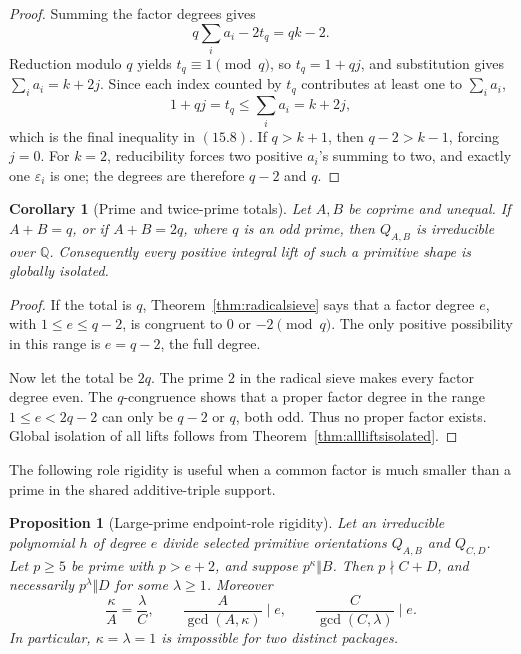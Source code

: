 \documentclass[11pt]{article}
\newtheorem{proposition}[theorem]{Proposition}
\newtheorem{corollary}[theorem]{Corollary}
\theoremstyle{definition}
\newcommand{\Q}{\mathbb Q}
\begin{document}
\begin{proof}
Summing the factor degrees gives
\[
 q\sum_i a_i-2t_q=qk-2.
\]
Reduction modulo \(q\) yields \(t_q\equiv1\pmod q\), so
\(t_q=1+qj\), and substitution gives \(\sum_i a_i=k+2j\).  Since each
index counted by \(t_q\) contributes at least one to \(\sum_i a_i\),
\[
 1+qj=t_q\leq\sum_i a_i=k+2j,
\]
which is the final inequality in \((15.8)\).  If \(q>k+1\), then
\(q-2>k-1\), forcing \(j=0\).  For \(k=2\), reducibility forces two
positive \(a_i\)'s summing to two, and exactly one \(\varepsilon_i\) is
one; the degrees are therefore \(q-2\) and \(q\).
\end{proof}

\begin{corollary}[Prime and twice-prime totals]
\label{cor:prime-totals}
Let \(A,B\) be coprime and unequal.  If \(A+B=q\), or if
\(A+B=2q\), where \(q\) is an odd prime, then \(Q_{A,B}\) is
irreducible over \(\Q\).  Consequently every positive integral lift of
such a primitive shape is globally isolated.
\end{corollary}

\begin{proof}
If the total is \(q\), Theorem~\ref{thm:radicalsieve} says that a factor
degree \(e\), with \(1\leq e\leq q-2\), is congruent to \(0\) or
\(-2\pmod q\).  The only positive possibility in this range is
\(e=q-2\), the full degree.

Now let the total be \(2q\).  The prime \(2\) in the radical sieve makes
every factor degree even.  The \(q\)-congruence shows that a proper factor
degree in the range \(1\leq e<2q-2\) can only be \(q-2\) or \(q\), both
odd.  Thus no proper factor exists.  Global isolation of all lifts follows
from Theorem~\ref{thm:allliftsisolated}.
\end{proof}

The following role rigidity is useful when a common factor is much smaller
than a prime in the shared additive-triple support.

\begin{proposition}[Large-prime endpoint-role rigidity]
\label{prop:largerole}
Let an irreducible polynomial \(h\) of degree \(e\) divide selected
primitive orientations \(Q_{A,B}\) and \(Q_{C,D}\).  Let \(p\geq5\) be
prime with \(p>e+2\), and suppose \(p^\kappa\Vert B\).  Then
\(p\nmid C+D\), and necessarily \(p^\lambda\Vert D\) for some
\(\lambda\geq1\).  Moreover
\begin{equation}
 \frac{\kappa}{A}=\frac{\lambda}{C},
 \qquad
 \frac{A}{\gcd(A,\kappa)}\mid e,
 \qquad
 \frac{C}{\gcd(C,\lambda)}\mid e.
 \tag{15.9}
\end{equation}
In particular, \(\kappa=\lambda=1\) is impossible for two distinct
packages.
\end{proposition}
\end{document}
